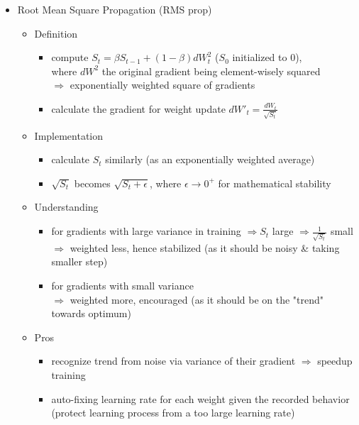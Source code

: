 \begin{itemize}
\item Root Mean Square Propagation (RMS prop)
	\begin{itemize}
	\item Definition
		\begin{itemize}
		\item compute $S_t = \beta S_{t-1} + (1-\beta) dW_t^2$ ($S_0$ initialized to $0$),\\ 
		where $dW^2$ the original gradient being element-wisely squared\\
		$\Rightarrow$ exponentially weighted square of gradients
		\item calculate the gradient for weight update $dW'_t=\frac {dW_t}{\sqrt{S_t}}$
		\end{itemize}
	\item Implementation
		\begin{itemize}
		\item calculate $S_t$ similarly (as an exponentially weighted average)
		\item $\sqrt{S_t}$ becomes $\sqrt{S_t+\epsilon}$, where $\epsilon\rightarrow 0^+$ for mathematical stability
		\end{itemize}
	\item Understanding
		\begin{itemize}
		\item for gradients with large variance in training $\Rightarrow S_t$ large $\Rightarrow \frac 1{\sqrt{S_t}}$ small \\ 
		$\Rightarrow$ weighted less, hence stabilized (as it should be noisy \& taking smaller step)
		\item for gradients with small variance \\ 
		$\Rightarrow$ weighted more, encouraged (as it should be on the "trend" towards optimum)
		\end{itemize}
	\item Pros
		\begin{itemize}
		\item recognize trend from noise via variance of their gradient $\Rightarrow$ speedup training
		\item auto-fixing learning rate for each weight given the recorded behavior \\ 
		(protect learning process from a too large learning rate)
		\end{itemize}
	\end{itemize}
	

\end{itemize}
